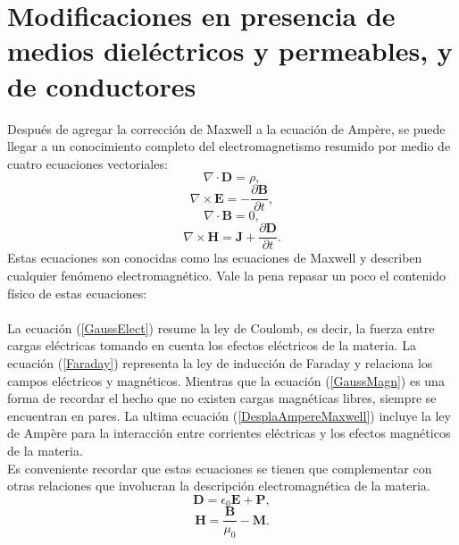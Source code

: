 \documentclass[11pt,fleqn]{book} %
\begin{document}
\section{Modificaciones en presencia de medios diel\'ectricos y permeables, y de conductores}
Despu\'es de agregar la correcci\'on de  Maxwell a la ecuaci\'on de Ampère, se puede llegar a un conocimiento completo del electromagnetismo resumido por medio de cuatro ecuaciones vectoriales:\\
\begin{equation}
\nabla \cdot \textbf{D}=\rho, \label{GaussElect}
 \end{equation}
 \begin{equation}
 \nabla \times \textbf{E}=-\frac{\partial \textbf{B}}{\partial t},  \label{Faraday}
 \end{equation}
 \begin{equation}
 \nabla \cdot \textbf{B}=0,  \label{GaussMagn}
 \end{equation}
 \begin{equation}
 \nabla \times \textbf{H}=\textbf{J}+\frac{\partial \textbf{D}}{\partial t}.  \label{DesplaAmpereMaxwell}
 \end{equation}
 Estas ecuaciones son conocidas como las ecuaciones de Maxwell y describen cualquier fen\'omeno electromagn\'etico. Vale la pena repasar un poco el contenido f\'isico de estas ecuaciones:\\\\
 La ecuaci\'on (\ref{GaussElect}) resume la ley de Coulomb, es decir, la fuerza entre cargas el\'ectricas tomando en cuenta los efectos el\'ectricos de la materia. La ecuaci\'on (\ref{Faraday}) representa la ley de inducci\'on de Faraday y relaciona los campos el\'ectricos y magn\'eticos. Mientras que la ecuaci\'on (\ref{GaussMagn}) es una forma de recordar el hecho que no existen cargas magn\'eticas libres, siempre se encuentran en pares. La ultima ecuaci\'on (\ref{DesplaAmpereMaxwell}) incluye la ley de Ampère para la interacci\'on entre corrientes el\'ectricas y los efectos magn\'eticos de la materia.\\
Es conveniente recordar que estas ecuaciones se tienen que complementar con otras relaciones que involucran la descripci\'on electromagn\'etica de la materia.
\begin{equation}
\textbf{D}=\epsilon_{0} \textbf{E}+\textbf{P},  \label{VectorDesplazamineto}
\end{equation}
\begin{equation}
\textbf{H}=\frac{\textbf{B}}{\mu_{0}}-\textbf{M}.  \label{Campo H}
\end{equation}
\end{document}
